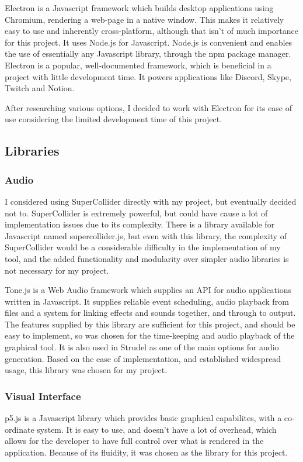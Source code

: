 \documentclass[12pt,a4paper,twoside,openright]{report}
\begin{document}
Electron is a Javascript framework which builds desktop applications using Chromium, rendering a web-page in a native window. This makes it relatively easy to use and inherently cross-platform, although that isn't of much importance for this project. It uses Node.js for Javascript. Node.js is convenient and enables the use of essentially any Javascript library, through the npm package manager. Electron is a popular, well-documented framework, which is beneficial in a project with little development time. It powers applications like Discord, Skype, Twitch and Notion.

After researching various options, I decided to work with Electron for its ease of use considering the limited development time of this project.

\subsection{Libraries}
\subsubsection{Audio}
I considered using SuperCollider directly with my project, but eventually decided not to. SuperCollider is extremely powerful, but could have cause a lot of implementation issues due to its complexity. There is a library available for Javascript named supercollider.js, but even with this library, the complexity of SuperCollider would be a considerable difficulty in the implementation of my tool, and the added functionality and modularity over simpler audio libraries is not necessary for my project.

Tone.js is a Web Audio framework which supplies an API for audio applications written in Javascript. It supplies reliable event scheduling, audio playback from files and a system for linking effects and sounds together, and through to output. The features supplied by this library are sufficient for this project, and should be easy to implement, so was chosen for the time-keeping and audio playback of the graphical tool. It is also used in Strudel as one of the main options for audio generation. Based on the ease of implementation, and established widespread usage, this library was chosen for my project.

\subsubsection{Visual Interface}
p5.js is a Javascript library which provides basic graphical capabilites, with a co-ordinate system. It is easy to use, and doesn't have a lot of overhead, which allows for the developer to have full control over what is rendered in the application. Because of its fluidity, it was chosen as the library for this project.
\end{document}
